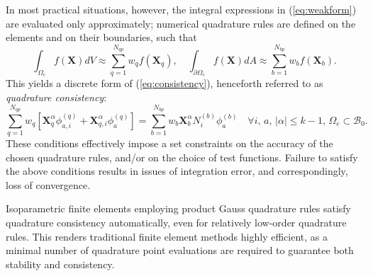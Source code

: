 In most practical situations, however, the integral expressions in (\ref{eq:weakform}) are evaluated only approximately; numerical quadrature rules are defined on the elements and on their boundaries, such that
\begin{equation}
  \int_{\Omega_e} f(\mathbf{X}) dV \approx \sum_{q=1}^{N_{qp}} w_q f(\mathbf{X}_q), \quad \int_{\partial \Omega_e} f(\mathbf{X}) dA \approx \sum_{b=1}^{N_{bp}} w_b f(\mathbf{X}_b).
\end{equation}
This yields a discrete form of (\ref{eq:consistency}), henceforth referred to as \textit{quadrature consistency}:
\begin{equation}
  \sum_{q=1}^{N_{qp}} w_q \left[ \mathbf{X}_q^{\alpha} \phi^{(q)}_{a,i} + \mathbf{X}^{\alpha}_{q,i} \phi^{(q)}_a \right] = \sum_{b=1}^{N_{bp}} w_b \mathbf{X}_b^{\alpha} N^{(b)}_i \phi^{(b)}_a \quad \forall i, \, a, \, | \alpha | \leq k-1, \, \Omega_e \subset \mathcal{B}_0.
  \label{eq:quadrature_consistency}
\end{equation}
These conditions effectively impose a set constraints on the accuracy of the chosen quadrature rules, and/or on the choice of test functions. Failure to satisfy the above conditions results in issues of integration error, and correspondingly, loss of convergence.

Isoparametric finite elements employing product Gauss quadrature rules satisfy quadrature consistency automatically, even for relatively low-order quadrature rules. This renders traditional finite element methods highly efficient, as a minimal number of quadrature point evaluations are required to guarantee both stability and consistency.